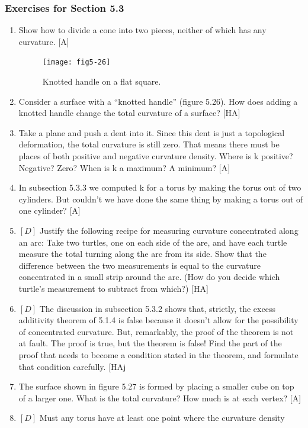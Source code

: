 \documentclass{book}
\begin{document}
\subsubsection{Exercises for Section 5.3}

\begin{enumerate}
\item Show how to divide a cone into two pieces, neither of which has any
curvature. [A]
\begin{figure}
\begin{center}
\texttt{[image: fig5-26]}
\caption{Knotted handle on a flat square.}
\end{center}
\end{figure}
\item Consider a surface with a ``knotted handle'' (figure 5.26). How does
adding a knotted handle change the total curvature of a surface? [HA]
\item Take a plane and push a dent into it. Since this dent is just a topological deformation, the total curvature is still zero. That means there must
be places of both positive and negative curvature density. Where is k
positive? Negative? Zero? When is k a maximum? A minimum?
[A]
\item In subsection 5.3.3 we computed k for a torus by making the torus out
of two cylinders. But couldn't we have done the same thing by making
a torus out of one cylinder? [A]
\item $[D]$ Justify the following recipe for measuring curvature concentrated
along an arc: Take two turtles, one on each side of the are, and have each
turtle measure the total turning along the arc from its side. Show that
the difference between the two measurements is equal to the curvature
concentrated in a small strip around the arc. (How do you decide which
turtle's measurement to subtract from which?) [HA]
\item $[D]$ The discussion in subsection 5.3.2 shows that, strictly, the excess
additivity theorem of 5.1.4 is false because it doesn't allow for the
possibility of concentrated curvature. But, remarkably, the proof of the
theorem is not at fault. The proof is true, but the theorem is false!
Find the part of the proof that needs to become a condition stated in
the theorem, and formulate that condition carefully. [HAj
\item The surface shown in figure 5.27 is formed by placing a smaller cube
on top of a larger one. What is the total curvature? How much is at
each vertex? [A]
\item $[D]$ Must any torus have at least one point where the curvature density

\end{enumerate}
\end{document}
